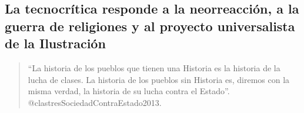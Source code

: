 \documentclass[
]{article}
\begin{document}
\hypertarget{la-tecnocruxedtica-responde-a-la-neorreacciuxf3n-a-la-guerra-de-religiones-y-al-proyecto-universalista-de-la-ilustraciuxf3n}{%
\subsection{La tecnocrítica responde a la neorreacción, a la guerra de
religiones y al proyecto universalista de la
Ilustración}\label{la-tecnocruxedtica-responde-a-la-neorreacciuxf3n-a-la-guerra-de-religiones-y-al-proyecto-universalista-de-la-ilustraciuxf3n}}

\begin{quote}
``La historia de los pueblos que tienen una Historia es la historia de
la lucha de clases. La historia de los pueblos sin Historia es, diremos
con la misma verdad, la historia de su lucha contra el Estado''.
@clastresSociedadContraEstado2013.
\end{quote}
\end{document}
